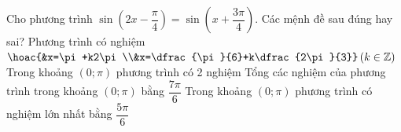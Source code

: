 \begin{ex}%
 Cho phương trình $\sin \left(2x-\dfrac{\pi}{4}\right)=\sin \left(x+\dfrac{3\pi}{4}\right)$. Các mệnh đề sau đúng hay sai? 
  \choiceTF
  {\True Phương trình có nghiệm  $\hoac{&x=\pi+k2\pi\\&x=\dfrac{\pi}{6}+k\dfrac{2\pi}{3}}\,(k\in \mathbb{Z})$}
  {\True Trong khoảng $(0;\pi)$ phương trình  có 2 nghiệm}
  {Tổng các nghiệm của phương trình trong khoảng $(0;\pi)$ bằng  $\dfrac{7\pi}{6}$}
  {\True Trong khoảng $(0;\pi)$ phương trình  có nghiệm lớn nhất bằng $\dfrac{5\pi}{6}$}
\end{ex}

